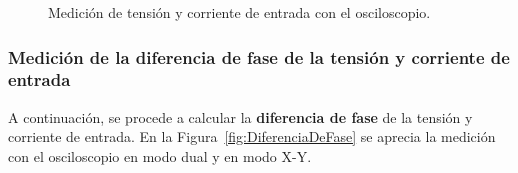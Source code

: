       \begin{figure}[H]
        \centering
        \caption{Medición de tensión y corriente de entrada con el osciloscopio.}
        \label{fig:Vi_Ii}
      \end{figure}
  
    \subsubsection{Medición de la diferencia de fase de la tensión y corriente de entrada}
    A continuación, se procede a calcular la \textbf{diferencia de fase} de la tensión y corriente de entrada.
    En la Figura~\ref{fig:DiferenciaDeFase} se aprecia la medición con el osciloscopio en modo dual y en modo X-Y.

